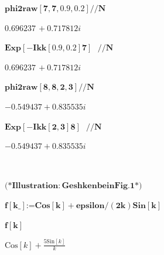 {\begin{doublespace}
\noindent\(\pmb{\text{phi2raw}[7,7,0.9,0.2] \text{//}N}\)
\end{doublespace}

\begin{doublespace}
\noindent\(0.696237\, +0.717812 i\)
\end{doublespace}

\begin{doublespace}
\noindent\(\pmb{\text{Exp}[-I \text{kk}[0.9,0.2] 7]\text{  }\text{//}N}\)
\end{doublespace}

\begin{doublespace}
\noindent\(0.696237\, +0.717812 i\)
\end{doublespace}

\begin{doublespace}
\noindent\(\pmb{\text{phi2raw}[8,8,2,3] \text{//}N}\)
\end{doublespace}

\begin{doublespace}
\noindent\(-0.549437+0.835535 i\)
\end{doublespace}

\begin{doublespace}
\noindent\(\pmb{\text{Exp}[-I \text{kk}[2,3] 8]\text{  }\text{//}N}\)
\end{doublespace}

\begin{doublespace}
\noindent\(-0.549437+0.835535 i\)
\end{doublespace}

\begin{doublespace}
\noindent\(\pmb{\text{}}\)
\end{doublespace}

\begin{doublespace}
\noindent\(\pmb{\text{(*} \text{Illustration}: \text{Geshkenbein} \text{Fig}. 1 \text{*)}}\)
\end{doublespace}

\begin{doublespace}
\noindent\(\pmb{f[\text{k$\_$}]\text{:=}\text{Cos}[k]+\text{epsilon}/(2k) \text{Sin}[k]}\)
\end{doublespace}

\begin{doublespace}
\noindent\(\pmb{f[k]}\)
\end{doublespace}

\begin{doublespace}
\noindent\(\text{Cos}[k]+\frac{5 \text{Sin}[k]}{k}\)
\end{doublespace}

}
